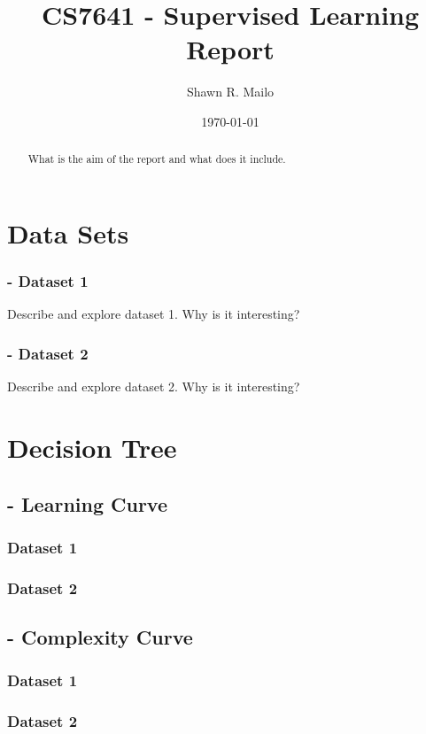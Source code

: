 \documentclass[letterpaper,12pt]{article}
\begin{document}
\title{CS7641 - Supervised Learning Report}
\author{Shawn R. Mailo}
\date{\today}
\maketitle

\begin{abstract}
What is the aim of the report and what does it include.
\end{abstract}

\section*{Data Sets}
\subsubsection*{- Dataset 1}
Describe and explore dataset 1. Why is it interesting?
\subsubsection*{- Dataset 2}
Describe and explore dataset 2. Why is it interesting?


\section*{Decision Tree}
\subsection*{- Learning Curve}
\subsubsection*{	Dataset 1}
\subsubsection*{	Dataset 2}

\subsection*{- Complexity Curve}
\subsubsection*{	Dataset 1}
\subsubsection*{	Dataset 2}
\end{document}
